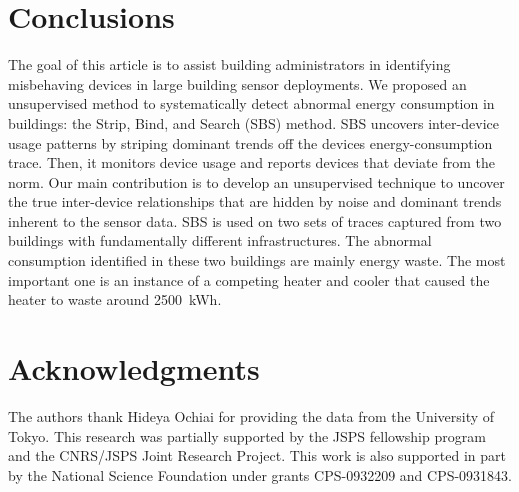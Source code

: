 \section{Conclusions}
The goal of this article is to assist building administrators in identifying misbehaving devices in large building sensor
deployments.  
We proposed an unsupervised method to systematically detect abnormal energy consumption in buildings: the Strip, Bind, and Search (SBS) method.
SBS uncovers inter-device usage patterns by striping dominant trends off the devices energy-consumption trace.
Then, it monitors device usage and reports devices that deviate from the norm.  
Our main contribution is to develop an unsupervised technique to uncover the true inter-device relationships that are hidden by noise and 
dominant trends inherent to the sensor data.  
SBS is used on two sets of traces captured from two buildings with fundamentally different infrastructures.
The abnormal consumption identified in these two buildings are mainly energy waste.
The most important one is an instance of a competing heater and cooler that caused the heater to waste around 2500~kWh.



\section*{Acknowledgments}
The authors thank Hideya Ochiai for providing the data from the University of Tokyo.
This research was partially supported by the JSPS fellowship program and the CNRS/JSPS Joint Research Project.
This work is also supported in part by the National Science Foundation under grants CPS-0932209 and CPS-0931843.
